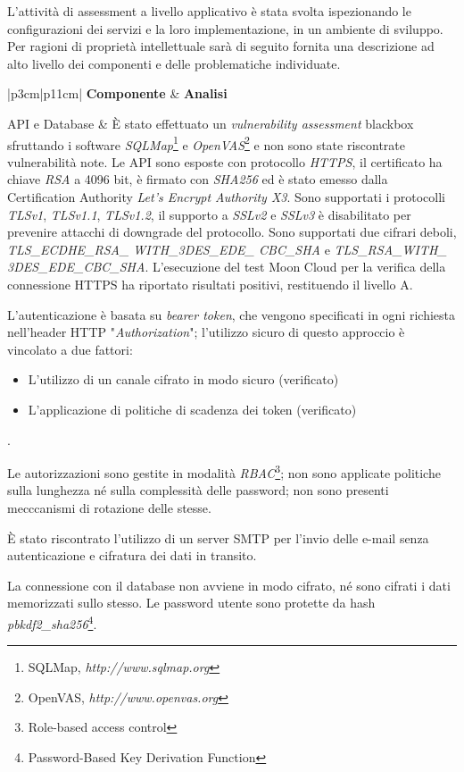 \documentclass[../main.tex]{subfiles}
\begin{document}
L'attività di assessment a livello applicativo è stata svolta ispezionando le configurazioni dei servizi e la loro implementazione, in un ambiente di sviluppo.
Per ragioni di proprietà intellettuale sarà di seguito fornita una descrizione ad alto livello dei componenti e delle problematiche individuate.

\begin{ltabulary}{|p{3cm}|p{11cm}|}
\hline
\textbf{Componente} & \textbf{Analisi} \\
\hline
\endhead

API e Database & È stato effettuato un \textit{vulnerability assessment} blackbox sfruttando i software \textit{SQLMap}\footnote{SQLMap, \textit{http://www.sqlmap.org}} e \textit{OpenVAS}\footnote{OpenVAS, \textit{http://www.openvas.org}} e non sono state riscontrate vulnerabilità note.
Le API sono esposte con protocollo \textit{HTTPS}, il certificato ha chiave \textit{RSA} a 4096 bit, è firmato con \textit{SHA256} ed è stato emesso dalla Certification Authority \textit{Let's Encrypt Authority X3}. Sono supportati i protocolli \textit{TLSv1}, \textit{TLSv1.1}, \textit{TLSv1.2}, il supporto a \textit{SSLv2} e \textit{SSLv3} è disabilitato per prevenire attacchi di downgrade del protocollo. Sono supportati due cifrari deboli, \textit{TLS\_ECDHE\_RSA\_ WITH\_3DES\_EDE\_ CBC\_SHA} e \textit{TLS\_RSA\_WITH\_ 3DES\_EDE\_CBC\_SHA}. L'esecuzione del test Moon Cloud per la verifica della connessione HTTPS ha riportato risultati positivi, restituendo il livello A.

L'autenticazione è basata su \textit{bearer token}, che vengono specificati in ogni richiesta nell'header HTTP "\textit{Authorization}"; l'utilizzo sicuro di questo approccio è vincolato a due fattori:
\begin{itemize}
    \item L'utilizzo di un canale cifrato in modo sicuro (verificato)
    \item L'applicazione di politiche di scadenza dei token (verificato)
\end{itemize}.

Le autorizzazioni sono gestite in modalità \textit{RBAC}\footnote{Role-based access control}; non sono applicate politiche sulla lunghezza né sulla complessità delle password; non sono presenti mecccanismi di rotazione delle stesse.

È stato riscontrato l'utilizzo di un server SMTP per l'invio delle e-mail senza autenticazione e cifratura dei dati in transito.

La connessione con il database non avviene in modo cifrato, né sono cifrati i dati memorizzati sullo stesso. Le password utente sono protette da hash \textit{pbkdf2\_sha256}\footnote{Password-Based Key Derivation Function}.
\\ \hline



\end{ltabulary}
\end{document}
